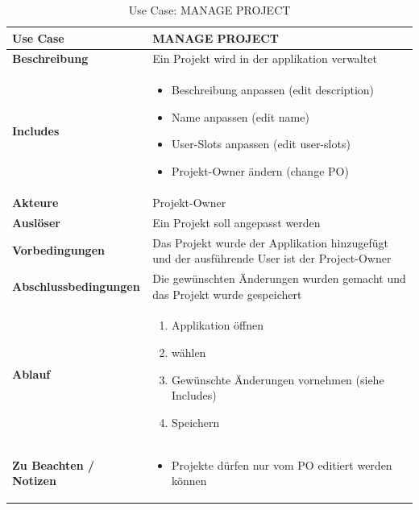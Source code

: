 \begin{table}[H]
    \centering
    \settowidth{}
    \setlength\extrarowheight{2pt}
    \begin{tabulary}{1.0\textwidth}{|m{4cm}|m{9cm}|}
      \hline
      \textbf{Use Case} &
      \textbf{MANAGE PROJECT}\\
      \hline
      \textbf{Beschreibung} &
      Ein Projekt wird in der applikation verwaltet\\ 
      \hline
      \textbf{Includes} &
      \begin{itemize}
        \item Beschreibung anpassen (edit description)
        \item Name anpassen (edit name)
        \item User-Slots anpassen (edit user-slots)
        \item Projekt-Owner ändern (change PO)
        \end{itemize}\\ 
      \hline 
      \textbf{Akteure} &
      Projekt-Owner\\ 
      \hline
      \textbf{Auslöser} &
      Ein Projekt soll angepasst werden\\ 
      \hline
      \textbf{Vorbedingungen} &
      Das Projekt wurde der Applikation hinzugefügt und der ausführende User ist der Project-Owner\\ 
      \hline
      \textbf{Abschlussbedingungen} &
      Die gewünschten Änderungen wurden gemacht und das Projekt wurde gespeichert\\ 
      \hline
      \textbf{Ablauf} &
      \begin{enumerate}
        \item Applikation öffnen
        \item <Projekt Editieren> wählen
        \item Gewünschte Änderungen vornehmen (siehe Includes)
        \item Speichern
        \end{enumerate}\\ 
      \hline
      \textbf{Zu Beachten / Notizen} &
      \begin{itemize}
        \item Projekte dürfen nur vom PO editiert werden können
        \end{itemize}\\ 
      \hline
    \end{tabulary}
    \caption{Use Case: MANAGE PROJECT}
  \end{table}